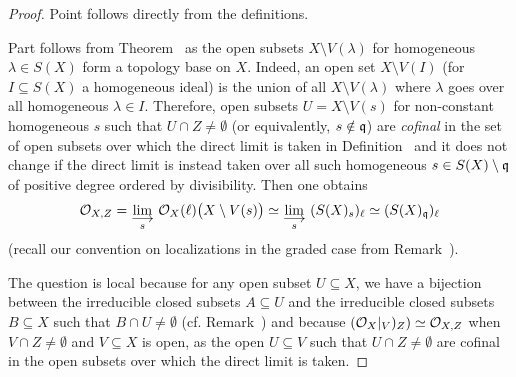 \documentclass[a4paper,parskip=half,numbers=enddot, DIV=12]{scrreprt}
\begin{document}
\begin{proof}
Point  follows directly from the definitions.

Part  follows from Theorem~ as the open subsets $X\setminus V(\lambda)$ for homogeneous $\lambda\in S(X)$ form a topology base on $X$. Indeed, an open set $X\setminus V(I)$ (for $I\subseteq S(X)$ a homogeneous ideal) is the union of all $X\setminus V(\lambda)$ where $\lambda$ goes over all homogeneous $\lambda\in I$. Therefore, open subsets $U= X\setminus V(s)$ for non-constant homogeneous $s$ such that $U\cap Z \neq \emptyset$ (or equivalently, $s\notin\mathfrak{q}$) are \emph{cofinal} in the set of open subsets over which the direct limit is taken in Definition~ and it does not change if the direct limit is instead taken over all such homogeneous $s\in S(X)\setminus\mathfrak{q}$ of positive degree ordered by divisibility. Then one obtains 
\begin{align*}
	\Oo_{X,Z}=\colimit[s]\Oo_X(\ell)\big(X\setminus V(s)\big)\simeq\colimit[s] (S(X)_s)_\ell \simeq (S(X)_\qq)_\ell
\end{align*}
(recall our convention on localizations in the graded case from Remark~).

The question  is local because for any open subset $U\subseteq X$, we have a bijection between the irreducible closed subsets $A\subseteq U$ and the irreducible closed subsets $B\subseteq X$ such that $B\cap U\neq\emptyset$ (cf. Remark~) and because $(\mathcal{O}_X|_V)_Z) \simeq \mathcal{O}_{X,Z}$ when $V\cap Z\neq \emptyset$ and $V\subseteq X$ is open, as the open $U\subseteq V$ such that $U\cap Z\neq\emptyset$ are cofinal in the open subsets over which the direct limit is taken.


\end{proof}
\end{document}
